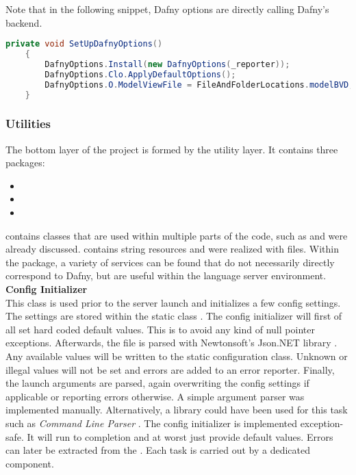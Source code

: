 Note that in the following snippet, Dafny options are directly calling Dafny's backend.
\begin{lstlisting}[language=csharp, caption={Setting up Dafny Options}, captionpos=b, label={lst:setupdafnyoptions}]
    private void SetUpDafnyOptions()
    {
        DafnyOptions.Install(new DafnyOptions(_reporter));
        DafnyOptions.Clo.ApplyDefaultOptions();
        DafnyOptions.O.ModelViewFile = FileAndFolderLocations.modelBVD;
    }
\end{lstlisting}


\subsubsection{Utilities}
The bottom layer of the project is formed by the utility layer.
It contains three packages:
\begin{itemize}
    \item {}
    \item {}
    \item {}
\end{itemize}
 contains classes that are used within multiple parts of the code, such as  and were already discussed.
 contains string resources and were realized with  files.
Within the  package,
a variety of services can be found that do not necessarily directly correspond to Dafny,
but are useful within the language server environment.\\

\textbf{Config Initializer}\\
This class is used prior to the server launch and initializes a few config settings.
The settings are stored within the static class .
The config initializer will first of all set hard coded default values.
This is to avoid any kind of null pointer exceptions.
Afterwards, the file \linebreak
{} is parsed with Newtonsoft's Json.NET library \cite{jsondotnet}. 
Any available values will be written to the static configuration class.
Unknown or illegal values will not be set and errors are added to an error reporter.
Finally, the launch arguments are parsed, again overwriting the config settings if applicable or reporting errors otherwise.
A simple argument parser was implemented manually.
Alternatively, a library could have been used for this task such as \textit{Command Line Parser} \cite{clparser}.
The config initializer is implemented exception-safe.
It will run to completion and at worst just provide default values.
Errors can later be extracted from the .
Each task is carried out by a dedicated component.\\

